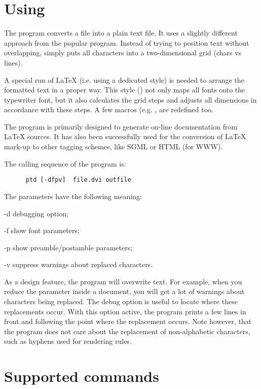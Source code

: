 \section{Using \protect\PTD}

The program \PTD{} converts a  file into a plain text file.
It uses a slightly different approach from the popular  program.
Instead of trying to position text without overlapping, \PTD{}
simply puts all characters into a two-dimensional grid (chars vs lines).
 
A special run of \LaTeX{} (i.e. using a dedicated style) is needed to
arrange the formatted text in a proper way.
This style () not only maps all fonts onto the typewriter font,
but it also calculates the grid steps and adjusts all dimensions in
accordance with these steps.
A few macros (e.g. ,  are redefined too.
 
The \PTD{} program is primarily designed to generate on-line documentation
from
\LaTeX{} sources.
It has also been successfully used for the conversion of \LaTeX{} mark-up
to other tagging schemes, like SGML or HTML (for WWW).
 
The calling sequence of the program is:
\begin{verbatim}
      ptd [-dfpv]  file.dvi outfile
\end{verbatim}
 
The parameters have the following meaning:
\begin{DLtt}{12}
\item[-d]   debugging option;
\item[-f]   show font parameters;
\item[-p]   show preamble/postamble parameters;
\item[-v]   suppress warnings about replaced characters.
\end{DLtt}
 
 
As a design feature, the \PTD{} program will overwrite text. 
For example, when you reduce the  parameter
inside a document, you will get a lot of warnings about 
characters being replaced.
The debug option is useful to locate where these replacements occur.
With this option active, the \PTD{} program prints a few lines in front
and following the point where the replacement occurs.
Note however, that the program does not care about 
the replacement of non-alphabetic characters, such as 
hyphens used for rendering rules.
 
\section[]{Supported  commands}
 
